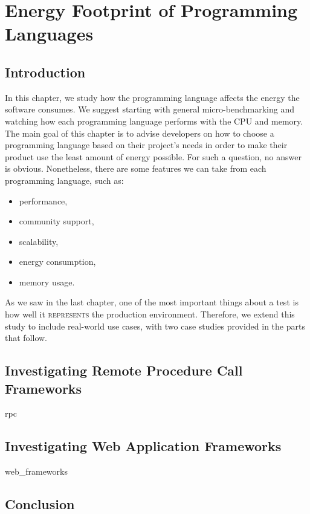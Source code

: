 \chapter{Energy Footprint of Programming Languages}
\label{chapter:porgramming_langauges}
\section{Introduction}
In this chapter, we study how the programming language affects the energy the software consumes.
We suggest starting with general micro-benchmarking and watching how each programming language performs with the CPU and memory.
The main goal of this chapter is to advise developers on how to choose a programming language based on their project's needs in order to make their product use the least amount of energy possible.
For such a question, no answer is obvious.
Nonetheless, there are some features we can take from each programming language, such as:
\begin{itemize}
    \item performance,
    \item community support,
    \item scalability,
    \item energy consumption,
    \item memory usage.
\end{itemize}

As we saw in the last chapter, one of the most important things about a test is how well it \textsc{represents} the production environment.
Therefore, we extend this study to include real-world use cases, with two case studies provided in the parts that follow.

\section{Investigating Remote Procedure Call Frameworks}
{rpc}
\clearpage

\section{Investigating Web Application Frameworks}
{web_frameworks}

\section{Conclusion}
